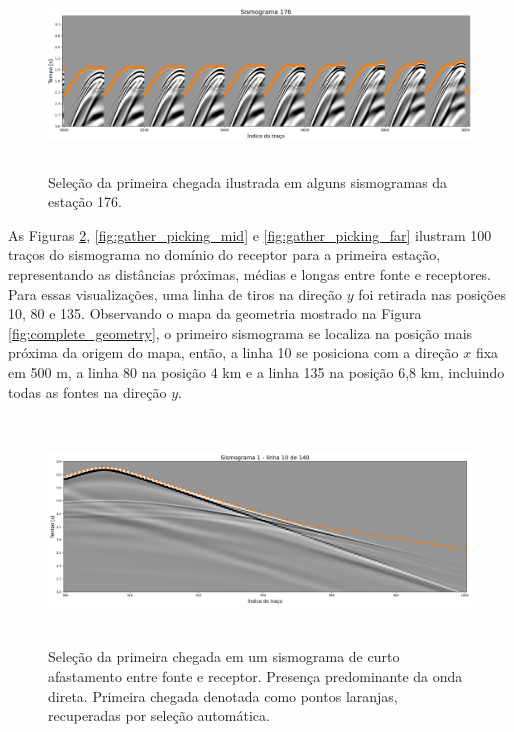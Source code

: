\begin{figure}[H]
	\centering
	\includegraphics[width=16cm,height=5cm]{Imgs/Metodologia/gather_example.png}
	\caption{Seleção da primeira chegada ilustrada em alguns sismogramas da estação 176.}
	\label{fig:gather_example}	
\end{figure}

As Figuras \ref{fig:gather_picking_near}, \ref{fig:gather_picking_mid} e \ref{fig:gather_picking_far} ilustram 100 traços do sismograma no domínio do receptor para a primeira estação, representando as distâncias próximas, médias e longas entre fonte e receptores. Para essas visualizações, uma linha de tiros na direção $y$ foi retirada nas posições 10, 80 e 135. Observando o mapa da geometria mostrado na Figura \ref{fig:complete_geometry}, o primeiro sismograma se localiza na posição mais próxima da origem do mapa, então, a linha 10 se posiciona com a direção $x$ fixa em 500 m, a linha 80 na posição 4 km e a linha 135 na posição 6,8 km, incluindo todas as fontes na direção $y$. 

\begin{figure}[H]
	\centering
	\includegraphics[width=16cm,height=6cm]{Imgs/Metodologia/linha10_sismo1.png}
	\caption{Seleção da primeira chegada em um sismograma de curto afastamento entre fonte e receptor. Presença predominante da onda direta. Primeira chegada denotada como pontos laranjas, recuperadas por seleção automática.}
	\label{fig:gather_picking_near}	
\end{figure}

